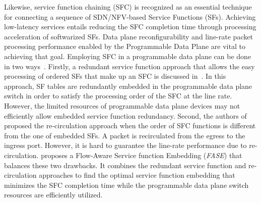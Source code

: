

Likewise, service function chaining (SFC) is recognized as an essential technique for connecting a sequence of SDN/NFV-based Service Functions (SFs). Achieving low-latency services entails reducing the SFC completion time through processing acceleration of softwarized SFs. Data plane reconfigurability and line-rate packet processing performance enabled by the Programmable Data Plane are vital to achieving that goal. 
Employing SFC in a programmable data plane can be done in two ways~\cite{FASE}. Firstly, a redundant service function approach that allows the easy processing of ordered SFs that make up an SFC is discussed in~\cite{P4SC}. In this approach, SF tables are redundantly embedded in the programmable data plane switch in order to satisfy the processing order of the SFC at the line rate. However, the limited resources of programmable data plane devices may not efficiently allow embedded service function redundancy. Second, the authors of ~\cite{AccSFC, RESFC} proposed the re-circulation approach when the order of SFC functions is different from the one of embedded SFs. A packet is recirculated from the egress to the ingress port. However, it is hard to guarantee the line-rate performance due to re-circulation. \cite{FASE} proposes a Flow-Aware Service function Embedding (\textit{FASE}) that balances these two drawbacks. It combines the redundant service function and re-circulation approaches to find the optimal service function embedding that minimizes the SFC completion time while the programmable data plane switch resources are efficiently utilized. 

